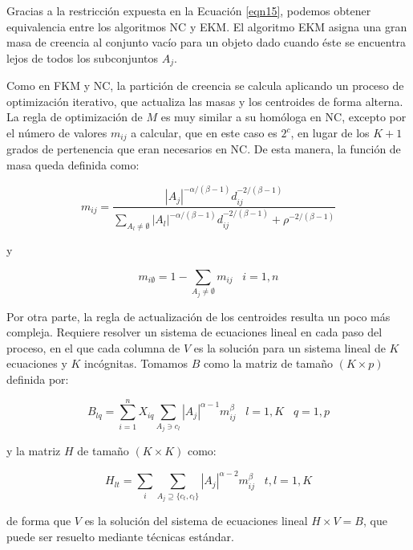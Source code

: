 Gracias a la restricción expuesta en la Ecuación \ref{eqn15}, podemos obtener equivalencia entre los algoritmos \acs{NC} y \acs{EKM}. El algoritmo \acs{EKM} asigna una gran masa de creencia al conjunto vacío para un objeto dado cuando éste se encuentra lejos de todos los subconjuntos $A_j$.

Como en \acs{FKM} y \acs{NC}, la partición de creencia se calcula aplicando un proceso de optimización iterativo, que actualiza las masas  y los centroides de forma alterna. La regla de optimización de $M$ es muy similar a su homóloga en \acs{NC}, excepto por el número de valores $m_{ij}$ a calcular, que en este caso es $2^c$, en lugar de los $K + 1$ grados de pertenencia que eran necesarios en \acs{NC}. De esta manera, la función de masa queda definida como:

 \begin{equation}
m_{ij} = \frac{|A_j|^{-\alpha/(\beta-1)} d_{ij}^{-2/(\beta-1)}}{\sum_{A_l \ne \emptyset}|A_l|^{-\alpha/(\beta-1)} d_{ij}^{-2/(\beta-1)} + \rho^{-2/(\beta-1)}}
 \label{eqn16}
 \end{equation}
 
 y
 
\begin{equation}
m_{i\emptyset} = 1 - \sum_{A_j \ne \emptyset}m_{ij} \;\;\; i = 1,n
\label{eqn17}
\end{equation}

Por otra parte, la regla de actualización de los centroides resulta un poco más compleja. Requiere resolver un sistema de ecuaciones lineal en cada paso del proceso, en el que cada columna de $V$ es la solución para un sistema lineal de $K$ ecuaciones y $K$ incógnitas. Tomamos $B$ como la matriz de tamaño $(K \times p)$ definida por:

\begin{equation}
B_{lq} = \sum_{i=1}^{n} X_{iq} \sum_{A_j \ni c_l} |A_j|^{\alpha-1} m_{ij}^\beta \;\;\; l = 1,K \;\;\; q =1,p
\label{eqn18}
\end{equation}

y la matriz $H$ de tamaño $(K \times K)$ como:

\begin{equation}
H_{lt} = \sum_{i} \sum_{A_j \supseteq \{c_t,c_l\}} |A_j|^{\alpha - 2} m_{ij}^\beta \;\;\; t,l = 1,K
\label{eqn20}
\end{equation}

de forma que $V$ es la solución del sistema de ecuaciones lineal $H\times V = B$, que puede ser resuelto mediante técnicas estándar.

